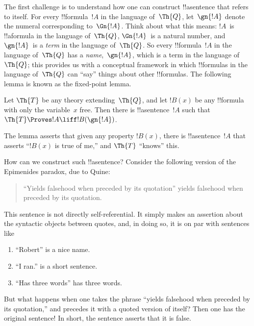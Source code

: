 \documentclass[../../../include/open-logic-section]{subfiles}
\begin{document}
The first challenge is to understand how one can construct !!a{sentence}
that refers to itself. For every !!{formula}~$!A$ in the language
of~$\Th{Q}$, let~$\gn{!A}$ denote the numeral corresponding
to~$\Gn{!A}$. Think about what this means: $!A$~is !!a{formula} in the
language of~$\Th{Q}$, $\Gn{!A}$~is a natural number, and $\gn{!A}$~is
a \emph{term} in the language of~$\Th{Q}$. So every !!{formula}~$!A$
in the language of~$\Th{Q}$ has a \emph{name},~$\gn{!A}$, which is a
term in the language of~$\Th{Q}$; this provides us with a conceptual
framework in which !!{formula}s in the language of~$\Th{Q}$ can ``say''
things about other !!{formula}s. The following lemma is known as the
fixed-point lemma.

\begin{lem}
Let $\Th{T}$ be any theory extending~$\Th{Q}$, and let $!B(x)$ be any
!!{formula} with only the variable~$x$ free. Then there is
!!a{sentence}~$!A$ such that $\Th{T} \Proves!A \liff !B(\gn{!A})$.
\end{lem}

The lemma asserts that given any property $!B(x)$, there is
!!a{sentence}~$!A$ that asserts ``$!B(x)$ is true of me,'' and
$\Th{T}$ ``knows'' this.

How can we construct such !!a{sentence}? Consider the following version
of the Epimenides paradox, due to Quine:
\begin{quote}
``Yields falsehood when preceded by its quotation'' yields falsehood
when preceded by its quotation.
\end{quote}
This sentence is not directly self-referential. It simply makes an
assertion about the syntactic objects between quotes, and, in doing
so, it is on par with sentences like
\begin{enumerate}
\item ``Robert'' is a nice name.
\item ``I ran.'' is a short sentence.
\item ``Has three words'' has three words.
\end{enumerate}
But what happens when one takes the phrase ``yields falsehood when
preceded by its quotation,'' and precedes it with a quoted version of
itself? Then one has the original sentence!{} In short, the sentence
asserts that it is false.
\end{document}
